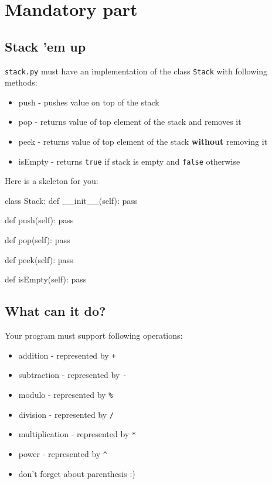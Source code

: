 \documentclass{42-en}
\begin{document}
\chapter{Mandatory part}

    \section{Stack 'em up}
    
    \texttt{stack.py} must have an implementation of the class \texttt{Stack}
    with following methods:

            \begin{itemize}\itemsep1pt
                \item push - pushes value on top of the stack
                \item pop - returns value of top element of the stack and removes it
                \item peek - returns value of top element of the stack \textbf{without} removing it
                \item isEmpty - returns \texttt{true} if stack is empty and \texttt{false} otherwise
            \end{itemize}
    Here is a skeleton for you: 
\begin{42pycode}
class Stack:
    def __init__(self):
        pass
    
    def push(self):
        pass
    
    def pop(self):
        pass

    def peek(self):
        pass

    def isEmpty(self):
        pass
\end{42pycode}

    \section{What can it do?}
    
    Your program must support following operations:
        \begin{itemize}\itemsep1pt
            \item addition - represented by \texttt{+}
            \item subtraction - represented by \texttt{-}
            \item modulo - represented by \texttt{\%}
            \item division - represented by \texttt{/}
            \item multiplication - represented by \texttt{*}
            \item power - represented by \texttt{\^}
            \item don't forget about parenthesis :) 
        \end{itemize}
\end{document}
